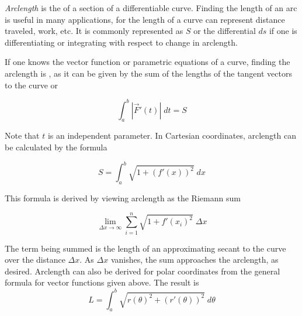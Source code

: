 \documentclass[12pt]{article}
\begin{document}

\emph{Arclength} is the  of a section of a differentiable curve. Finding the length of an arc is useful in many applications, for the length of a curve can represent distance traveled, work, etc. It is commonly represented as $S$ or the differential $ds$ if one is differentiating or integrating with respect to change in arclength. 

If one knows the vector function or parametric equations of a curve, finding the arclength is , as it can be given by the sum of the lengths of the tangent vectors to the curve or 

$$ \int_a^b |\vec{F}'(t)| \; dt=S $$ 

Note that $t$ is an independent parameter. In Cartesian coordinates, arclength can be calculated by the formula 

$$ S=\int_a^b \sqrt{1+(f'(x))^2} \; dx $$ 

This formula is derived by viewing arclength as the Riemann sum 

$$ \lim_{\Delta x\rightarrow\infty}\sum_{i=1}^n \sqrt{1+f'(x_i)^2}\; \Delta x $$ 

The term being summed is the length of an approximating secant to the curve over the distance $\Delta x$. As $\Delta x$ vanishes, the sum approaches the arclength, as desired. Arclength can also be derived for polar coordinates from the general formula for vector functions given above. The result is
$$ L = \int_a^b \sqrt{r(\theta)^2 + (r'(\theta))^2}\; d\theta$$
\end{document}
